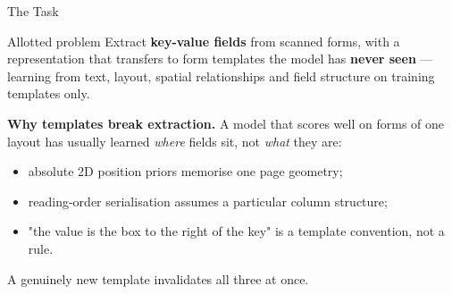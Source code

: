 \documentclass[aspectratio=169, 11pt]{beamer}
\begin{document}
\begin{frame}{The Task}
  \begin{block}{Allotted problem}
    Extract \textbf{key-value fields} from scanned forms, with a representation that
    transfers to form templates the model has \textbf{never seen} — learning from text,
    layout, spatial relationships and field structure on training templates only.
  \end{block}

  \medskip
  \textbf{Why templates break extraction.} A model that scores well on forms of one layout
  has usually learned \emph{where} fields sit, not \emph{what} they are:
  \begin{itemize}
    \item absolute 2D position priors memorise one page geometry;
    \item reading-order serialisation assumes a particular column structure;
    \item "the value is the box to the right of the key" is a template convention, not a rule.
  \end{itemize}

  \medskip
  A genuinely new template invalidates all three at once.
\end{frame}
\end{document}
